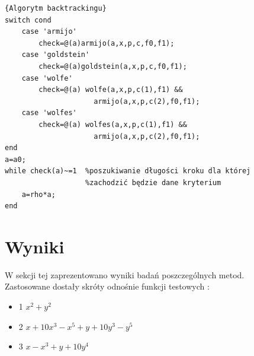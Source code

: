 \documentclass{classrep}
\begin{document}
\begin{lstlisting}{Algorytm backtrackingu}
switch cond
    case 'armijo'
        check=@(a)armijo(a,x,p,c,f0,f1);
    case 'goldstein'
        check=@(a)goldstein(a,x,p,c,f0,f1);
    case 'wolfe'
        check=@(a) wolfe(a,x,p,c(1),f1) &&
        			 armijo(a,x,p,c(2),f0,f1);
    case 'wolfes'
        check=@(a) wolfes(a,x,p,c(1),f1) &&
        			 armijo(a,x,p,c(2),f0,f1);
end
a=a0;
while check(a)~=1  %poszukiwanie długości kroku dla której
                   %zachodzić będzie dane kryterium
    a=rho*a;
end

\end{lstlisting}

\section{Wyniki}
W sekcji tej zaprezentowano wyniki badań poszczególnych metod.\\
Zastosowane dostały skróty odnośnie funkcji testowych :
\begin{itemize}
\item 1 $x^2+y^2$
\item 2 $x+10x^3-x^5 +y+10y^3-y^5$
\item 3 $x-x^3 +y+10y^4$
\end{itemize}
\end{document}
